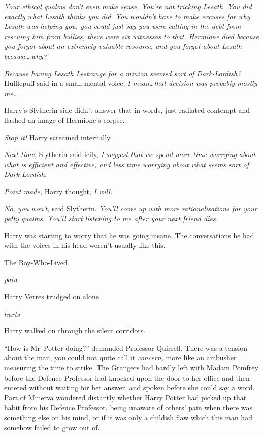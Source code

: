 \emph{Your ethical qualms don’t even make sense. You’re not tricking Lesath.
You did exactly what Lesath thinks you did. You wouldn’t have to make excuses
for why Lesath was helping you, you could just say you were calling in the debt
from rescuing him from bullies, there were six witnesses to that. Hermione died
because you forgot about an extremely valuable resource, and you forgot about
Lesath because…why?}

\emph{Because having Lesath Lestrange for a minion seemed sort of
Dark-Lordish?} Hufflepuff said in a small mental voice. \emph{I mean…that
decision was probably mostly me…}

Harry’s Slytherin side didn’t answer that in words, just radiated contempt and
flashed an image of Hermione’s corpse.

\emph{Stop it!} Harry screamed internally.

\emph{Next time,} Slytherin said icily, \emph{I suggest that we spend more time
worrying about what is efficient and effective, and less time worrying about
what seems sort of Dark-Lordish.}

\emph{Point made,} Harry thought, \emph{I will.}

\emph{No, you won’t,} said Slytherin. \emph{You’ll come up with more
rationalisations for your petty qualms. You’ll start listening to me after
your \emph{next} friend dies.}

Harry was starting to worry that he was going insane. The conversations he had
with the voices in his head weren’t usually like this.

The Boy-Who-Lived

\emph{pain}

Harry Verres trudged on alone

\emph{hurts}

Harry walked on through the silent corridors.

\later

“How is Mr~Potter doing?” demanded Professor Quirrell. There was a tension
about the man, you could not quite call it \emph{concern,} more like an
ambusher measuring the time to strike. The Grangers had hardly left with Madam
Pomfrey before the Defence Professor had knocked upon the door to her office
and then entered without waiting for her answer, and spoken before she could
say a word. Part of Minerva wondered distantly whether Harry Potter had picked
up that habit from his Defence Professor, being unaware of others’ pain when
there was something else on his mind, or if it was only a childish flaw which
this man had somehow failed to grow out of.

